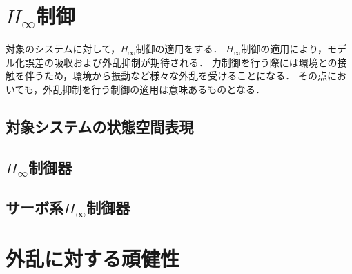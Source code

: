 \section{$H_\infty$制御}
対象のシステムに対して，$H_\infty$制御の適用をする．
$H_\infty$制御の適用により，モデル化誤差の吸収および外乱抑制が期待される\cite{三平満司1997実用的な,平田201703}．
力制御を行う際には環境との接触を伴うため，環境から振動など様々な外乱を受けることになる．
その点においても，外乱抑制を行う制御の適用は意味あるものとなる．
\subsection{対象システムの状態空間表現}

\subsection{$H_\infty$制御器}
\subsection{サーボ系$H_\infty$制御器}

\section{外乱に対する頑健性}

